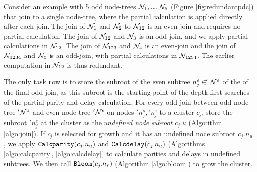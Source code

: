 Consider an example with 5 odd node-trees $\mathcal{N}_1, ...,  \mathcal{N}_5$ (Figure \ref{fig:redundantpdc}) that join to a single node-tree, where the partial calculation is applied directly after each join. The join of $\mathcal{N}_1$ and $\mathcal{N}_2$ to $\mathcal{N}_{12}$ is an even-join and requires no partial calculation. The join of $\mathcal{N}_{12}$ and $\mathcal{N}_3$ is an odd-join, and we apply partial calculations in $\mathcal{N}_{12}$. The join of $\mathcal{N}_{123}$ and $\mathcal{N}_4$ is an even-join and the join of $\mathcal{N}_{1234}$ and $\mathcal{N}_5$ is an odd-join, with partial calculations in $\mathcal{N}_{1234}$. The earlier computation in $\mathcal{N}_{12}$ is thus redundant. 



The only task now is to store the subroot of the even subtree $n_j^e \in '\mathcal{N}^e$ of the of the final odd-join, as this subroot is the starting point of the depth-first searches of the partial parity and delay calculation. For every odd-join between odd node-tree $'\mathcal{N}^o$ and even node-tree $'\mathcal{N}^e$ on nodes $'n_j^o, 'n_j^e$ to a cluster $c_j$, store the subroot $'n^e_j$ at the cluster as the \emph{undefined node subroot} $c_j.u$ (Algorithm \ref{algo:join}). If $c_j$ is selected for growth and it has an undefined node subroot $c_j.n_u$, we apply $\texttt{Calcparity}(c_j.n_u)$ and $\texttt{Calcdelay}(c_j.n_u)$ (Algorithms \ref{algo:calcparity}, \ref{algo:calcdelay}) to calculate parities and delays in undefined subtrees. We then call $\texttt{Bloom}(c_j.n_r)$ (Algorithm \ref{algo:bloom}) to grow the cluster. 


